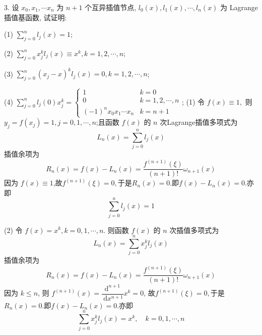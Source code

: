 \begin{tcolorbox}[breakable,enhanced,arc=0mm,outer arc=0mm,
		boxrule=0pt,toprule=1pt,leftrule=0pt,bottomrule=1pt, rightrule=0pt,left=0.2cm,right=0.2cm,
		titlerule=0.5em,toptitle=0.1cm,bottomtitle=-0.1cm,top=0.2cm,
		colframe=white!10!biru,colback=white!90!biru,coltitle=white,
            coltext=black,title =2024-03-10, title style={white!10!biru}, before skip=8pt, after skip=8pt,before upper=\hspace{2em},
		fonttitle=\bfseries,fontupper=\normalsize]
  
3. 设 $ x_{0}, x_{1}, \cdots x_{n} $ 为 $ n+1 $ 个互异插值节点, $ {l}_{{0}}({x}), {l}_{{1}}({x}), \cdots, {l}_{{n}}({x}) $ 为 Lagrange 插值基函数, 试证明:

(1) $ \sum\limits_{j=0}^{n} l_{j}(x)=1 $;

(2) $ \sum\limits_{j=0}^{n} x_{j}^{k} l_{j}(x) \equiv x^{k}, k=1,2, \cdots, n $;

(3) $ \sum\limits_{j=0}^{n}\left(x_{j}-x\right)^{k} l_{j}(x)=0, k=1,2, \cdots, n $;

(4) $ \sum\limits_{j=0}^{n} l_{j}(0) x_{j}^{k}=\left\{\begin{array}{ll}1 & k=0 \\ 0 & k=1,2, \cdots, n \\ (-1)^{n} x_{0} x_{1} \cdots x_{n} & k=n+1\end{array}\right. $;
 \tcblower
(1) 令 $ f(x)\equiv1,$ 则 $ y_{j}=f\left(x_{j}\right)=1, j=0,1, \cdots, n $;且函数 $ f(x) $ 的 $ n $ 次Lagrange插值多项式为
$$
L_{n}(x)=\sum_{j=0}^{n}  l_{j}(x)
$$
插值余项为
$$
R_{n}(x)=f(x)-L_{n}(x)=\frac{f^{(n+1)}(\xi)}{(n+1) !}  \omega_{n+1}(x)
$$
因为 $f(x)\equiv 1$,故$f^{(n+1)}(\xi)=0,$于是$R_{n}(x)=0 .$即$f(x)-L_{n}(x)=0$.亦即
$$
\sum_{j=0}^{n}  l_{j}(x)=1
$$

(2) 令 $ f(x)=x^{k}, k=0,1, \cdots, n $. 则函数 $ f(x) $ 的 $ n $ 次插值多项式为
$$
L_{n}(x)=\sum_{j=0}^{n} x_{j}^{k} l_{j}(x)
$$
插值余项为
$$
R_{n}(x)=f(x)-L_{n}(x)=\frac{f^{(n+1)}(\xi)}{(n+1) !}  \omega_{n+1}(x)
$$
因为 $ k \leqslant n $, 则 $ f^{(n+1)}(x)=\dfrac{\mathrm{d}^{n+1}}{\mathrm{~d} x^{n+1}} x^{k}=0 $,
故$f^{(n+1)}(\xi)=0,$于是$R_{n}(x)=0 .$即$f(x)-L_{n}(x)=0$.亦即
$$
\sum_{j=0}^{n} x_{j}^{k} l_{j}(x)=x^{k}, \quad k=0,1, \cdots, n
$$


\end{tcolorbox}
